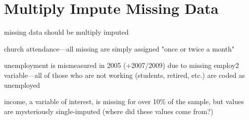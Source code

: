 
\section{Multiply Impute Missing Data}

missing data should be multiply imputed \citep[e.g.,][]{King2001}

church attendance---all missing are simply assigned "once or twice a month"

unemployment is mismeasured in 2005 (+2007/2009) due to missing employ2 variable---all of those who are not working (students, retired, etc.) are coded as unemployed

income, a variable of interest, is missing for over 10\% of the sample, but values are mysteriously single-imputed (where did these values come from?)
